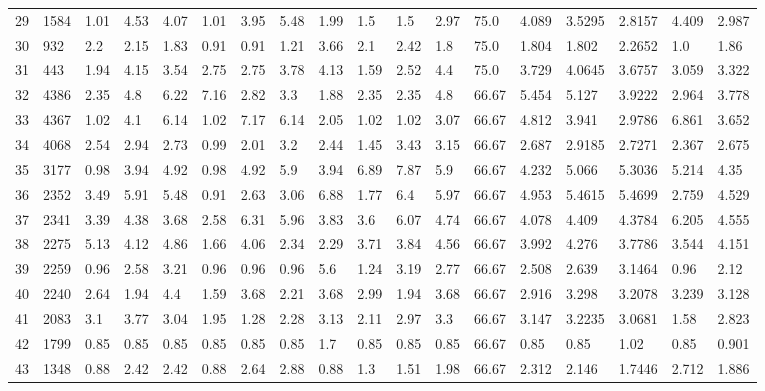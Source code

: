 \documentclass[landscape, 10pt]{report}
\begin{document}
\begin{longtable}{l || l || l | l | l | l | l | l | l | l | l | l | l || l | l | l | l | l}
\rowcolor{lightgray}29 & 1584 & 1.01 & 4.53 & 4.07 & 1.01 & 3.95 & 5.48 & 1.99 & 1.5 & 1.5 & 2.97 & 75.0 & 4.089 & 3.5295 & 2.8157 & 4.409 & 2.987\\ 
30 & 932 & 2.2 & 2.15 & 1.83 & 0.91 & 0.91 & 1.21 & 3.66 & 2.1 & 2.42 & 1.8 & 75.0 & 1.804 & 1.802 & 2.2652 & 1.0 & 1.86\\ 
\rowcolor{lightgray}31 & 443 & 1.94 & 4.15 & 3.54 & 2.75 & 2.75 & 3.78 & 4.13 & 1.59 & 2.52 & 4.4 & 75.0 & 3.729 & 4.0645 & 3.6757 & 3.059 & 3.322\\ 
32 & 4386 & 2.35 & 4.8 & 6.22 & 7.16 & 2.82 & 3.3 & 1.88 & 2.35 & 2.35 & 4.8 & 66.67 & 5.454 & 5.127 & 3.9222 & 2.964 & 3.778\\ 
\rowcolor{lightgray}33 & 4367 & 1.02 & 4.1 & 6.14 & 1.02 & 7.17 & 6.14 & 2.05 & 1.02 & 1.02 & 3.07 & 66.67 & 4.812 & 3.941 & 2.9786 & 6.861 & 3.652\\ 
34 & 4068 & 2.54 & 2.94 & 2.73 & 0.99 & 2.01 & 3.2 & 2.44 & 1.45 & 3.43 & 3.15 & 66.67 & 2.687 & 2.9185 & 2.7271 & 2.367 & 2.675\\ 
\rowcolor{lightgray}35 & 3177 & 0.98 & 3.94 & 4.92 & 0.98 & 4.92 & 5.9 & 3.94 & 6.89 & 7.87 & 5.9 & 66.67 & 4.232 & 5.066 & 5.3036 & 5.214 & 4.35\\ 
36 & 2352 & 3.49 & 5.91 & 5.48 & 0.91 & 2.63 & 3.06 & 6.88 & 1.77 & 6.4 & 5.97 & 66.67 & 4.953 & 5.4615 & 5.4699 & 2.759 & 4.529\\ 
\rowcolor{lightgray}37 & 2341 & 3.39 & 4.38 & 3.68 & 2.58 & 6.31 & 5.96 & 3.83 & 3.6 & 6.07 & 4.74 & 66.67 & 4.078 & 4.409 & 4.3784 & 6.205 & 4.555\\ 
38 & 2275 & 5.13 & 4.12 & 4.86 & 1.66 & 4.06 & 2.34 & 2.29 & 3.71 & 3.84 & 4.56 & 66.67 & 3.992 & 4.276 & 3.7786 & 3.544 & 4.151\\ 
\rowcolor{lightgray}39 & 2259 & 0.96 & 2.58 & 3.21 & 0.96 & 0.96 & 0.96 & 5.6 & 1.24 & 3.19 & 2.77 & 66.67 & 2.508 & 2.639 & 3.1464 & 0.96 & 2.12\\ 
40 & 2240 & 2.64 & 1.94 & 4.4 & 1.59 & 3.68 & 2.21 & 3.68 & 2.99 & 1.94 & 3.68 & 66.67 & 2.916 & 3.298 & 3.2078 & 3.239 & 3.128\\ 
\rowcolor{lightgray}41 & 2083 & 3.1 & 3.77 & 3.04 & 1.95 & 1.28 & 2.28 & 3.13 & 2.11 & 2.97 & 3.3 & 66.67 & 3.147 & 3.2235 & 3.0681 & 1.58 & 2.823\\ 
42 & 1799 & 0.85 & 0.85 & 0.85 & 0.85 & 0.85 & 0.85 & 1.7 & 0.85 & 0.85 & 0.85 & 66.67 & 0.85 & 0.85 & 1.02 & 0.85 & 0.901\\ 
\rowcolor{lightgray}43 & 1348 & 0.88 & 2.42 & 2.42 & 0.88 & 2.64 & 2.88 & 0.88 & 1.3 & 1.51 & 1.98 & 66.67 & 2.312 & 2.146 & 1.7446 & 2.712 & 1.886\\ 

\end{longtable}
\end{document}
